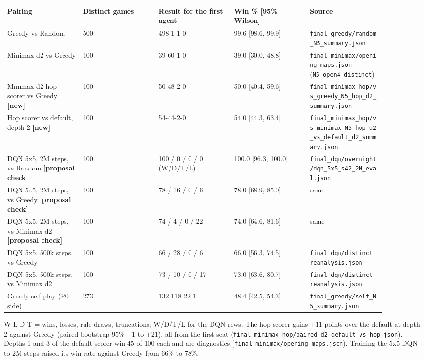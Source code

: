 \documentclass[11pt]{article}
\begin{document}
\begin{center}\scriptsize
\begin{longtable}{p{0.18\linewidth}p{0.18\linewidth}p{0.18\linewidth}p{0.18\linewidth}p{0.18\linewidth}}
\toprule
Pairing & Distinct games & Result for the first agent & Win \% [95\% Wilson] & Source \\
\midrule
Greedy vs Random & 500 & 498-1-1-0 & 99.6 [98.6, 99.9] & \texttt{final\_greedy/random\_N5\_summary.json} \\
Minimax d2 vs Greedy & 100 & 39-60-1-0 & 39.0 [30.0, 48.8] & \texttt{final\_minimax/opening\_maps.json} (\texttt{N5\_open4\_distinct}) \\
Minimax d2 hop scorer vs Greedy \textbf{[new]} & 100 & 50-48-2-0 & 50.0 [40.4, 59.6] & \texttt{final\_minimax\_hop/vs\_greedy\_N5\_hop\_d2\_summary.json} \\
Hop scorer vs default, depth 2 \textbf{[new]} & 100 & 54-44-2-0 & 54.0 [44.3, 63.4] & \texttt{final\_minimax\_hop/vs\_minimax\_N5\_hop\_d2\_vs\_default\_d2\_summary.json} \\
DQN 5x5, 2M steps, vs Random \textbf{[proposal check]} & 100 & 100 / 0 / 0 / 0 (W/D/T/L) & 100.0 [96.3, 100.0] & \texttt{final\_dqn/overnight/dqn\_5x5\_s42\_2M\_eval.json} \\
DQN 5x5, 2M steps, vs Greedy \textbf{[proposal check]} & 100 & 78 / 16 / 0 / 6 & 78.0 [68.9, 85.0] & same \\
DQN 5x5, 2M steps, vs Minimax d2 \textbf{[proposal check]} & 100 & 74 / 4 / 0 / 22 & 74.0 [64.6, 81.6] & same \\
DQN 5x5, 500k steps, vs Greedy & 100 & 66 / 28 / 0 / 6 & 66.0 [56.3, 74.5] & \texttt{final\_dqn/distinct\_reanalysis.json} \\
DQN 5x5, 500k steps, vs Minimax d2 & 100 & 73 / 10 / 0 / 17 & 73.0 [63.6, 80.7] & \texttt{final\_dqn/distinct\_reanalysis.json} \\
Greedy self-play (P0 side) & 273 & 132-118-22-1 & 48.4 [42.5, 54.3] & \texttt{final\_greedy/self\_N5\_summary.json} \\
\bottomrule
\end{longtable}
\end{center}

W-L-D-T = wins, losses, rule draws, truncations; W/D/T/L for the DQN rows. The hop scorer gains
+11 points over the default at depth 2 against Greedy (paired bootstrap 95\% +1 to +21), all from
the first seat (\texttt{final\_minimax\_hop/paired\_d2\_default\_vs\_hop.json}). Depths 1 and 3 of the
default scorer win 45 of 100 each and are diagnostics (\texttt{final\_minimax/opening\_maps.json}).
Training the 5x5 DQN to 2M steps raised its win rate against Greedy from 66\% to 78\%.
\end{document}
